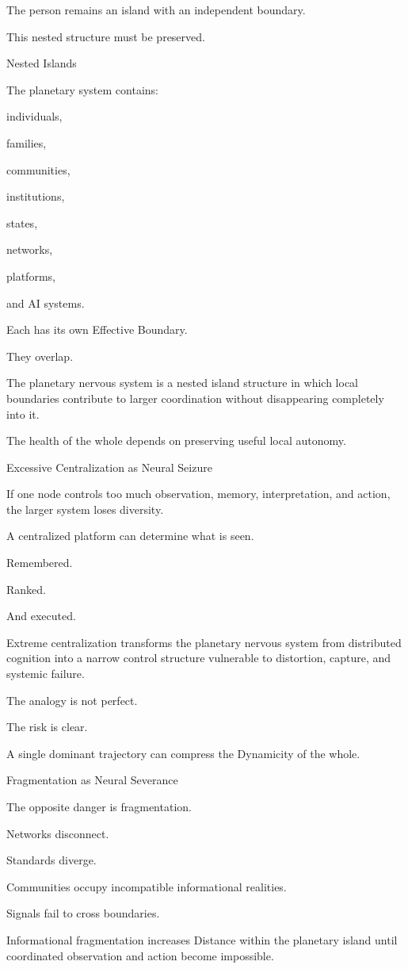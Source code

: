 The person remains an island with an independent boundary.

This nested structure must be preserved.

Nested Islands

The planetary system contains:

individuals,

families,

communities,

institutions,

states,

networks,

platforms,

and AI systems.

Each has its own Effective Boundary.

They overlap.

The planetary nervous system is a nested island structure in which local boundaries contribute to larger coordination without disappearing completely into it.

The health of the whole depends on preserving useful local autonomy.

Excessive Centralization as Neural Seizure

If one node controls too much observation, memory, interpretation, and action, the larger system loses diversity.

A centralized platform can determine what is seen.

Remembered.

Ranked.

And executed.

Extreme centralization transforms the planetary nervous system from distributed cognition into a narrow control structure vulnerable to distortion, capture, and systemic failure.

The analogy is not perfect.

The risk is clear.

A single dominant trajectory can compress the Dynamicity of the whole.

Fragmentation as Neural Severance

The opposite danger is fragmentation.

Networks disconnect.

Standards diverge.

Communities occupy incompatible informational realities.

Signals fail to cross boundaries.

Informational fragmentation increases Distance within the planetary island until coordinated observation and action become impossible.

